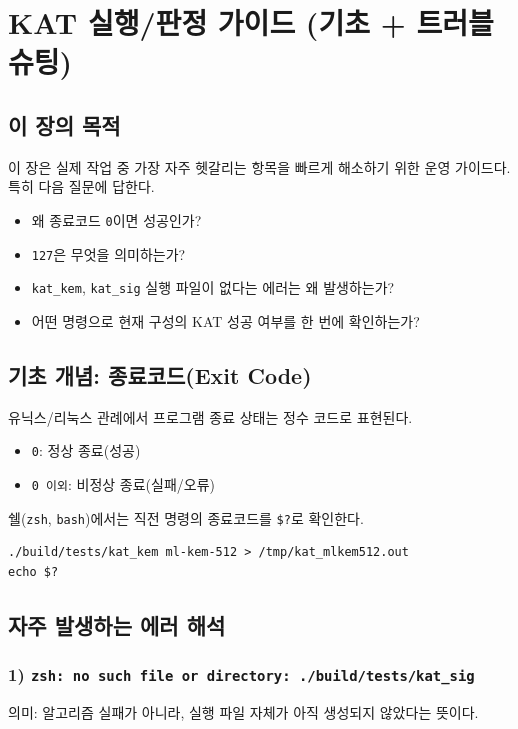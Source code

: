 \section{KAT 실행/판정 가이드 (기초 + 트러블슈팅)}

\subsection{이 장의 목적}
이 장은 실제 작업 중 가장 자주 헷갈리는 항목을 빠르게 해소하기 위한 운영 가이드다.
특히 다음 질문에 답한다.
\begin{itemize}[leftmargin=*]
\item 왜 종료코드 \texttt{0}이면 성공인가?
\item \texttt{127}은 무엇을 의미하는가?
\item \texttt{kat\_kem}, \texttt{kat\_sig} 실행 파일이 없다는 에러는 왜 발생하는가?
\item 어떤 명령으로 현재 구성의 KAT 성공 여부를 한 번에 확인하는가?
\end{itemize}

\subsection{기초 개념: 종료코드(Exit Code)}
유닉스/리눅스 관례에서 프로그램 종료 상태는 정수 코드로 표현된다.
\begin{itemize}[leftmargin=*]
\item \texttt{0}: 정상 종료(성공)
\item \texttt{0 이외}: 비정상 종료(실패/오류)
\end{itemize}

쉘(\texttt{zsh}, \texttt{bash})에서는 직전 명령의 종료코드를 \texttt{\$?}로 확인한다.
\begin{lstlisting}[style=cstyle,caption={종료코드 확인 예시}]
./build/tests/kat_kem ml-kem-512 > /tmp/kat_mlkem512.out
echo $?
\end{lstlisting}

\subsection{자주 발생하는 에러 해석}
\subsubsection*{1) \texttt{zsh: no such file or directory: ./build/tests/kat\_sig}}
의미: 알고리즘 실패가 아니라, 실행 파일 자체가 아직 생성되지 않았다는 뜻이다.

